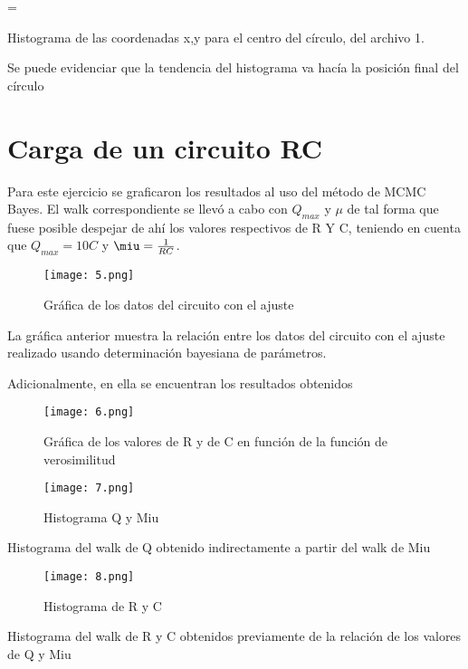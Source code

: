 =\documentclass[12pts,letterpaper]{article}
\begin{document}
Histograma de las coordenadas x,y para el centro del círculo, del archivo 1.  

Se puede evidenciar que la tendencia del histograma va hacía la posición final del círculo 

\section{Carga de un circuito RC}

Para este ejercicio se graficaron los resultados al uso del método de MCMC Bayes. El walk correspondiente se llevó a cabo con $Q_{max}$ y $\mu$ de tal forma que fuese posible despejar de ahí los valores respectivos de R Y C, teniendo en cuenta que $Q_{max} = 10C$ y $\miu = \frac{1}{RC}$.

\begin{figure}[H]
\begin{center}
\label{5}
\texttt{[image: 5.png]}
\caption {Gráfica de los datos del circuito con el ajuste}
\end{center}
\end{figure}

La gráfica anterior muestra la relación entre los datos del circuito con el ajuste realizado usando determinación bayesiana de parámetros. 

Adicionalmente, en ella se encuentran los resultados obtenidos

\begin{figure}[H]
\begin{center}
\label{6}
\texttt{[image: 6.png]}
\caption {Gráfica de los valores de R y de C en función de la función de verosimilitud}
\end{center}
\end{figure}


\begin{figure}[H]
\begin{center}
\label{7}
\texttt{[image: 7.png]}
\caption {Histograma Q y Miu}
\end{center}
\end{figure}

Histograma del walk de Q obtenido indirectamente a partir del walk de Miu

\begin{figure}[H]
\begin{center}
\label{8}
\texttt{[image: 8.png]}
\caption {Histograma de R y C}
\end{center}
\end{figure}

Histograma del walk de R y C obtenidos previamente de la relación de los valores de Q y Miu
\end{document}
